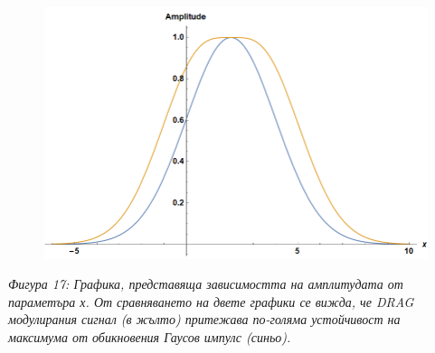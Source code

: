     \begin{figure}[H]
        \centering
        \includegraphics[width=370pt]{10.png}
    \end{figure}
    \begin{center}
        \small \textit{Фигура 17: Графика, представяща зависимостта на амплитудата от параметъра х. От сравняването на двете графики се вижда, че DRAG модулирания сигнал (в жълто) притежава по-голяма устойчивост на максимума от обикновения Гаусов импулс (синьо).}\\
    \end{center}

